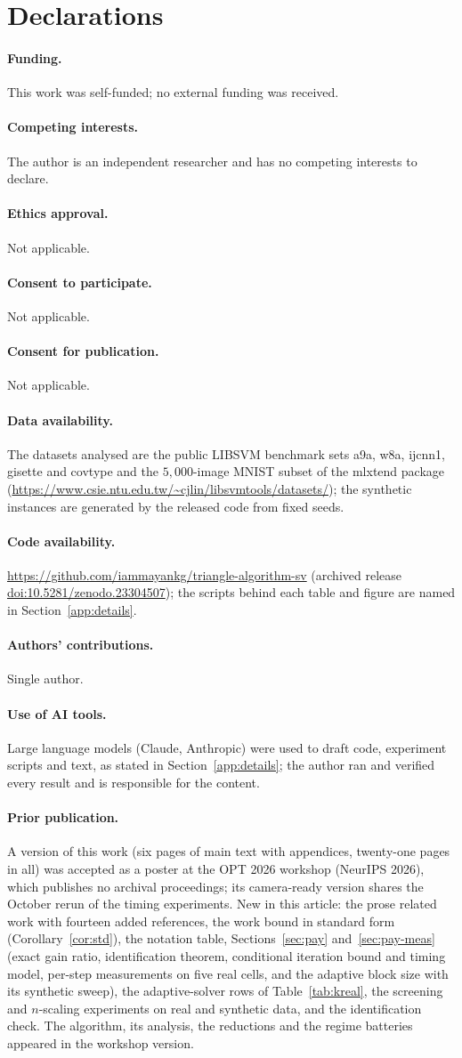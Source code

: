 \documentclass[pdflatex,sn-apa]{sn-jnl}%
\newif\ifsnjnl\snjnltrue
\newif\ifsnjnl\snjnlfalse
\theoremstyle{thmstyleone}
\theoremstyle{thmstyletwo}
\begin{document}
\ifsnjnl\backmatter\fi

\ifsnjnl
  \newcommand{\decl}[1]{\bmhead{#1}}
\else
  \section*{Declarations}
  \newcommand{\decl}[1]{\paragraph{#1.}}
\fi
\decl{Funding} This work was self-funded; no external funding was received.
\decl{Competing interests} The author is an independent researcher and has
no competing interests to declare.
\decl{Ethics approval} Not applicable.
\decl{Consent to participate} Not applicable.
\decl{Consent for publication} Not applicable.
\decl{Data availability} The datasets analysed are the public LIBSVM
benchmark sets a9a, w8a, ijcnn1, gisette and covtype and the
$5{,}000$-image MNIST subset of the mlxtend package
(\url{https://www.csie.ntu.edu.tw/~cjlin/libsvmtools/datasets/}); the
synthetic instances are generated by the released code from fixed seeds.
\decl{Code availability} \url{https://github.com/iammayankg/triangle-algorithm-sv}
(archived release \href{https://doi.org/10.5281/zenodo.23304507}{doi:10.5281/zenodo.23304507}); the scripts behind each table and figure
are named in Section~\ref{app:details}.
\decl{Authors' contributions} Single author.
\decl{Use of AI tools} Large language models (Claude, Anthropic) were
used to draft code, experiment scripts and text, as stated in
Section~\ref{app:details}; the author ran and verified every result
and is responsible for the content.
\decl{Prior publication} A version of this work (six pages of main
text with appendices, twenty-one pages in all) was accepted as a poster
at the OPT 2026 workshop (NeurIPS 2026), which publishes no archival
proceedings; its camera-ready version shares the October rerun of the
timing experiments. New in this article: the prose related work with
fourteen added references, the work bound in standard form
(Corollary~\ref{cor:std}), the notation table, Sections~\ref{sec:pay}
and~\ref{sec:pay-meas} (exact gain ratio, identification theorem,
conditional iteration bound and timing model, per-step measurements on
five real cells, and the adaptive block size with its synthetic sweep),
the adaptive-solver rows of Table~\ref{tab:kreal}, the screening and
$n$-scaling experiments on real and synthetic data, and the
identification check. The
algorithm, its analysis, the reductions and the regime batteries
appeared in the workshop version.

\ifsnjnl\else\fi

\end{document}
